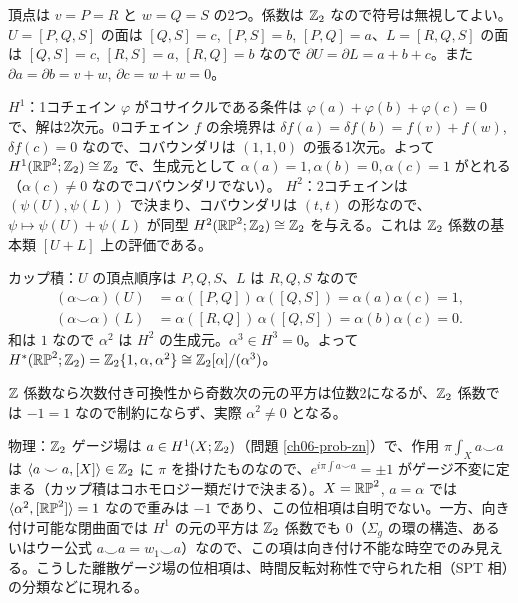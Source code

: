 \begin{solution}
頂点は $v=P=R$ と $w=Q=S$ の2つ。係数は $\mathbb{Z}_2$ なので符号は無視してよい。$U=[P,Q,S]$ の面は $[Q,S]=c$, $[P,S]=b$, $[P,Q]=a$、$L=[R,Q,S]$ の面は $[Q,S]=c$, $[R,S]=a$, $[R,Q]=b$ なので $\partial U=\partial L=a+b+c$。また $\partial a=\partial b=v+w$, $\partial c=w+w=0$。

$H^1$：1コチェイン $\varphi$ がコサイクルである条件は $\varphi(a)+\varphi(b)+\varphi(c)=0$ で、解は2次元。0コチェイン $f$ の余境界は $\delta f(a)=\delta f(b)=f(v)+f(w)$, $\delta f(c)=0$ なので、コバウンダリは $(1,1,0)$ の張る1次元。よって $H^1(\mathbb{RP}^2;\mathbb{Z}_2)\cong\mathbb{Z}_2$ で、生成元として $\alpha(a)=1,\alpha(b)=0,\alpha(c)=1$ がとれる（$\alpha(c)\neq0$ なのでコバウンダリでない）。
$H^2$：2コチェインは $(\psi(U),\psi(L))$ で決まり、コバウンダリは $(t,t)$ の形なので、$\psi\mapsto\psi(U)+\psi(L)$ が同型 $H^2(\mathbb{RP}^2;\mathbb{Z}_2)\cong\mathbb{Z}_2$ を与える。これは $\mathbb{Z}_2$ 係数の基本類 $[U+L]$ 上の評価である。

カップ積：$U$ の頂点順序は $P,Q,S$、$L$ は $R,Q,S$ なので
\[
\begin{aligned}
(\alpha\smile\alpha)(U)&=\alpha([P,Q])\,\alpha([Q,S])=\alpha(a)\alpha(c)=1,\\
(\alpha\smile\alpha)(L)&=\alpha([R,Q])\,\alpha([Q,S])=\alpha(b)\alpha(c)=0 .
\end{aligned}
\]
和は $1$ なので $\alpha^2$ は $H^2$ の生成元。$\alpha^3\in H^3=0$。よって $H^*(\mathbb{RP}^2;\mathbb{Z}_2)=\mathbb{Z}_2\{1,\alpha,\alpha^2\}\cong\mathbb{Z}_2[\alpha]/(\alpha^3)$。

$\mathbb{Z}$ 係数なら次数付き可換性から奇数次の元の平方は位数2になるが、$\mathbb{Z}_2$ 係数では $-1=1$ なので制約にならず、実際 $\alpha^2\neq0$ となる。

物理：$\mathbb{Z}_2$ ゲージ場は $a\in H^1(X;\mathbb{Z}_2)$（問題 \ref{ch06-prob-zn}）で、作用 $\pi\int_Xa\smile a$ は $\langle a\smile a,[X]\rangle\in\mathbb{Z}_2$ に $\pi$ を掛けたものなので、$e^{i\pi\int a\smile a}=\pm1$ がゲージ不変に定まる（カップ積はコホモロジー類だけで決まる）。$X=\mathbb{RP}^2$, $a=\alpha$ では $\langle\alpha^2,[\mathbb{RP}^2]\rangle=1$ なので重みは $-1$ であり、この位相項は自明でない。一方、向き付け可能な閉曲面では $H^1$ の元の平方は $\mathbb{Z}_2$ 係数でも $0$（$\Sigma_g$ の環の構造、あるいはウー公式 $a\smile a=w_1\smile a$）なので、この項は向き付け不能な時空でのみ見える。こうした離散ゲージ場の位相項は、時間反転対称性で守られた相（SPT 相）の分類などに現れる。
\end{solution}

